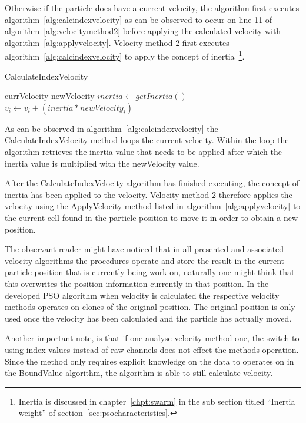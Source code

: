 Otherwise if the particle does have a current velocity, the algorithm first executes algorithm~\ref{alg:calcindexvelocity} as can be observed to occur on line 11 of algorithm~\ref{alg:velocitymethod2} before applying the calculated velocity with algorithm~\ref{alg:applyvelocity}. Velocity method 2 first executes algorithm~\ref{alg:calcindexvelocity} to apply the concept of inertia~\footnote{Inertia is discussed in chapter~\ref{chpt:swarm} in the sub section titled ``Inertia weight'' of section~\ref{sec:psocharacteristics}.}.

\begin{algorithm}
\caption{CalculateIndexVelocity}
\label{alg:calcindexvelocity}
\begin{algorithmic}[1]
	\REQUIRE currVelocity
	\REQUIRE newVelocity
		\STATE $inertia \leftarrow getInertia()$
		\STATE $v_i \leftarrow v_i + (inertia * newVelocity_i)$
	\ENDFOR
\end{algorithmic}
\end{algorithm}

As can be observed in algorithm~\ref{alg:calcindexvelocity} the CalculateIndexVelocity method loops the current velocity. Within the loop the algorithm retrieves the inertia value that needs to be applied after which the inertia value is multiplied with the newVelocity value.

After the CalculateIndexVelocity algorithm has finished executing, the concept of inertia has been applied to the velocity. Velocity method 2 therefore applies the velocity using the ApplyVelocity method listed in algorithm~\ref{alg:applyvelocity} to the current cell found in the particle position to move it in order to obtain a new position.

The observant reader might have noticed that in all presented and associated velocity algorithms the procedures operate and store the result in the current particle position that is currently being work on, naturally one might think that this overwrites the position information currently in that position. In the developed PSO algorithm when velocity is calculated the respective velocity methods operates on clones of the original position. The original position is only used once the velocity has been calculated and the particle has actually moved.

Another important note, is that if one analyse velocity method one, the switch to using index values instead of raw channels does not effect the methods operation. Since the method only requires explicit knowledge on the data to operates on in the BoundValue algorithm, the algorithm is able to still calculate velocity. 

